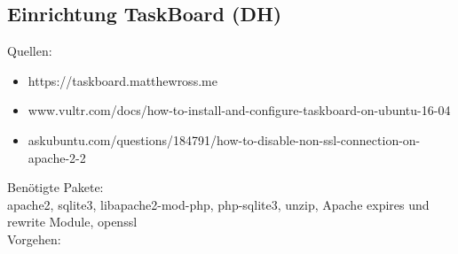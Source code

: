 
\newpage

\subsection{Einrichtung TaskBoard (DH)}
\label{Anhang_TaskBoard}
Quellen:
\begin{itemize}
	\item https://taskboard.matthewross.me
	\item www.vultr.com/docs/how-to-install-and-configure-taskboard-on-ubuntu-16-04
	\item askubuntu.com/questions/184791/how-to-disable-non-ssl-connection-on-apache-2-2
\end{itemize}
Benötigte Pakete:\\
apache2, sqlite3, libapache2-mod-php, php-sqlite3, unzip, Apache expires und rewrite 
Module, openssl\bigskip \\
Vorgehen:
